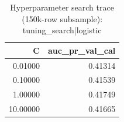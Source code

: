 \begin{table}
\caption{Hyperparameter search trace (150k-row subsample): tuning_search|logistic}
\label{tab:table14_hp_search_logistic}
\begin{tabular}{rr}
\toprule
C & auc\_pr\_val\_cal \\
\midrule
0.01000 & 0.41314 \\
0.10000 & 0.41539 \\
1.00000 & 0.41749 \\
10.00000 & 0.41665 \\
\bottomrule
\end{tabular}
\end{table}
